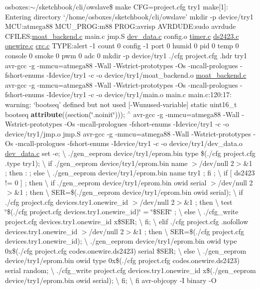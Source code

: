osboxes\-:$\sim$/sketchbook/cli/owslave\$ make C\-F\-G=project.\-cfg try1 make\mbox{[}1\mbox{]}\-: Entering directory `/home/osboxes/sketchbook/cli/owslave' mkdir -\/p device/try1 M\-C\-U\-:atmega88 M\-C\-U\-\_\-\-P\-R\-O\-G\-:m88 P\-R\-O\-G\-:avrisp A\-V\-R\-D\-U\-D\-E\-:sudo avrdude C\-F\-I\-L\-E\-S\-:\hyperlink{moat__backend_8c}{moat\-\_\-backend.\-c} main.\-c jmp.\-S \hyperlink{dev__data_8c}{dev\-\_\-data.\-c} config.\-o \hyperlink{timer_8c}{timer.\-c} \hyperlink{ds2423_8c}{ds2423.\-c} \hyperlink{onewire_8c}{onewire.\-c} \hyperlink{crc_8c}{crc.\-c} T\-Y\-P\-E\-:alert -\/1 count 0 config -\/1 port 0 humid 0 pid 0 temp 0 console 0 smoke 0 pwm 0 adc 0 mkdir -\/p device/try1 ./cfg project.\-cfg .hdr try1 avr-\/gcc -\/g -\/mmcu=atmega88 -\/\-Wall -\/\-Wstrict-\/prototypes -\/\-Os -\/mcall-\/prologues -\/fshort-\/enums -\/\-Idevice/try1 -\/c -\/o device/try1/moat\-\_\-backend.\-o \hyperlink{moat__backend_8c}{moat\-\_\-backend.\-c} avr-\/gcc -\/g -\/mmcu=atmega88 -\/\-Wall -\/\-Wstrict-\/prototypes -\/\-Os -\/mcall-\/prologues -\/fshort-\/enums -\/\-Idevice/try1 -\/c -\/o device/try1/main.\-o main.\-c main.\-c\-:120\-:17\-: warning\-: ‘bootseq’ defined but not used \mbox{[}-\/\-Wunused-\/variable\mbox{]} static uint16\-\_\-t bootseq {\bfseries attribute}((section(\char`\"{}.\-noinit\char`\"{}))); $^\wedge$ avr-\/gcc -\/g -\/mmcu=atmega88 -\/\-Wall -\/\-Wstrict-\/prototypes -\/\-Os -\/mcall-\/prologues -\/fshort-\/enums -\/\-Idevice/try1 -\/c -\/o device/try1/jmp.\-o jmp.\-S avr-\/gcc -\/g -\/mmcu=atmega88 -\/\-Wall -\/\-Wstrict-\/prototypes -\/\-Os -\/mcall-\/prologues -\/fshort-\/enums -\/\-Idevice/try1 -\/c -\/o device/try1/dev\-\_\-data.\-o \hyperlink{dev__data_8c}{dev\-\_\-data.\-c} set -\/e; \textbackslash{} ./gen\-\_\-eeprom device/try1/eprom.\-bin type \$(./cfg project.\-cfg .type try1); \textbackslash{} if ./gen\-\_\-eeprom device/try1/eprom.\-bin name $>$/dev/null 2$>$\&1 ; then \-: ; else \textbackslash{} ./gen\-\_\-eeprom device/try1/eprom.\-bin name try1 ; fi ; \textbackslash{} if \mbox{[} ds2423 != 0 \mbox{]} ; then \textbackslash{} if ./gen\-\_\-eeprom device/try1/eprom.\-bin owid serial $>$/dev/null 2$>$\&1 ; then \textbackslash{} S\-E\-R=\$(./gen\-\_\-eeprom device/try1/eprom.\-bin owid serial); \textbackslash{} if ./cfg project.\-cfg devices.\-try1.\-onewire\-\_\-id $>$/dev/null 2$>$\&1 ; then \textbackslash{} test \char`\"{}\$(./cfg project.\-cfg devices.\-try1.\-onewire\-\_\-id)\char`\"{} = \char`\"{}\$\-S\-E\-R\char`\"{} ; \textbackslash{} else \textbackslash{} ./cfg\-\_\-write project.\-cfg devices.\-try1.\-onewire\-\_\-id x\$\-S\-E\-R; \textbackslash{} fi; \textbackslash{} elif ./cfg project.\-cfg .nofollow devices.\-try1.\-onewire\-\_\-id $>$/dev/null 2$>$\&1 ; then \textbackslash{} S\-E\-R=\$(./cfg project.\-cfg devices.\-try1.\-onewire\-\_\-id); \textbackslash{} ./gen\-\_\-eeprom device/try1/eprom.\-bin owid type 0x\$(./cfg project.\-cfg codes.\-onewire.\-ds2423) serial \$\-S\-E\-R; \textbackslash{} else \textbackslash{} ./gen\-\_\-eeprom device/try1/eprom.\-bin owid type 0x\$(./cfg project.\-cfg codes.\-onewire.\-ds2423) serial random; \textbackslash{} ./cfg\-\_\-write project.\-cfg devices.\-try1.\-onewire\-\_\-id x\$(./gen\-\_\-eeprom device/try1/eprom.\-bin owid serial); \textbackslash{} fi; \textbackslash{} fi avr-\/objcopy -\/\-I binary -\/\-O 